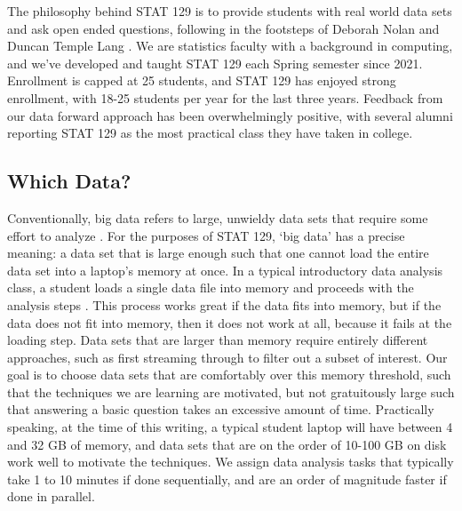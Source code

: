 \documentclass[12pt]{article}
\begin{document}
The philosophy behind STAT 129 is to provide students with real world data sets and ask open ended questions, following in the footsteps of Deborah Nolan and Duncan Temple Lang \cite{nolan2010computing}.
We are statistics faculty with a background in computing, and we've developed and taught STAT 129 each Spring semester since 2021.
Enrollment is capped at 25 students, and STAT 129 has enjoyed strong enrollment, with 18-25 students per year for the last three years.
Feedback from our data forward approach has been overwhelmingly positive, with several alumni reporting STAT 129 as the most practical class they have taken in college.

\subsection{Which Data?}
\label{sec:data}


Conventionally, big data refers to large, unwieldy data sets that require some effort to analyze \cite{sagiroglu2013big}.
For the purposes of STAT 129, `big data' has a precise meaning: a data set that is large enough such that one cannot load the entire data set into a laptop's memory at once.
In a typical introductory data analysis class, a student loads a single data file into memory and proceeds with the analysis steps \cite{wickham2023r}.
This process works great if the data fits into memory, but if the data does not fit into memory, then it does not work at all, because it fails at the loading step.
Data sets that are larger than memory require entirely different approaches, such as first streaming through to filter out a subset of interest.
Our goal is to choose data sets that are comfortably over this memory threshold, such that the techniques we are learning are motivated, but not gratuitously large such that answering a basic question takes an excessive amount of time.
Practically speaking, at the time of this writing, a typical student laptop will have between 4 and 32 GB of memory, and data sets that are on the order of 10-100 GB on disk work well to motivate the techniques.
We assign data analysis tasks that typically take 1 to 10 minutes if done sequentially, and are an order of magnitude faster if done in parallel.
\end{document}
